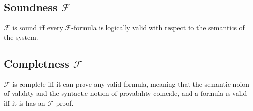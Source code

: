 \documentclass[a4paper]{article}
\begin{document}
\subsection{Soundness \(\mathcal{F}\)}

\(\mathcal{F}\) is sound iff every \(\mathcal{F}\)-formula is logically valid with respect to the semantics of the system. 

\subsection{Completness \(\mathcal{F}\)}

\(\mathcal{F}\) is complete iff
it can prove any valid formula, meaning that
the semantic noion of validity
and the syntactic notion of provability coincide,
and a formula is valid iff it is has an
\(\mathcal{F}\)-proof.
\end{document}
